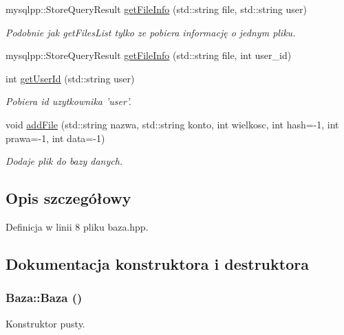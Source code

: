 \begin{CompactItemize}
mysqlpp::StoreQueryResult \hyperlink{a00001_e4a033a65cb585aa91c15fd8b8fde764}{getFileInfo} (std::string file, std::string user)
\begin{CompactList}\small\item\em Podobnie jak getFilesList tylko ze pobiera informację o jednym pliku. \item\end{CompactList}\item 
mysqlpp::StoreQueryResult \hyperlink{a00001_1d1cfca062ab3117b2b97281df012823}{getFileInfo} (std::string file, int user\_\-id)
\item 
int \hyperlink{a00001_65054f08c8fd7c600f6c2fe2c7f61a43}{getUserId} (std::string user)
\begin{CompactList}\small\item\em Pobiera id uzytkownika 'user'. \item\end{CompactList}\item 
void \hyperlink{a00001_f1bda4acd20e6fd00a35c43638e48956}{addFile} (std::string nazwa, std::string konto, int wielkosc, int hash=-1, int prawa=-1, int data=-1)
\begin{CompactList}\small\item\em Dodaje plik do bazy danych. \item\end{CompactList}\end{CompactItemize}


\subsection{Opis szczegółowy}


Definicja w linii 8 pliku baza.hpp.

\subsection{Dokumentacja konstruktora i destruktora}
\hypertarget{a00001_8edd83a7fa98b203a1ab58157a1660a4}{
\subsubsection[{Baza}]{\setlength{\rightskip}{0pt plus 5cm}Baza::Baza ()}}
\label{a00001_8edd83a7fa98b203a1ab58157a1660a4}


Konstruktor pusty. 



